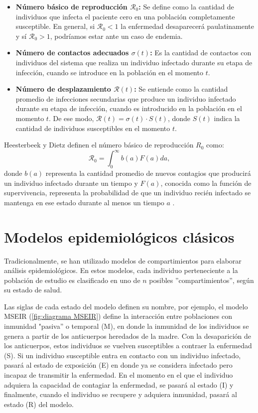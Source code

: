\begin{itemize}
    \item \textbf{Número básico de reproducción $\mathcal{R}_0$:} Se define como la cantidad de individuos que infecta el paciente cero en una población completamente susceptible. En general, si $\mathcal{R}_0<1$ la enfermedad desaparecerá paulatinamente y sí $\mathcal{R}_0>1$, podríamos estar ante un caso de endemia.
    \item \textbf{Número de contactos adecuados $\sigma(t)$:} Es la cantidad de contactos con individuos del sistema que realiza un individuo infectado durante su etapa de infección, cuando se introduce en la población en el momento $t$.
    \item \textbf{Número de desplazamiento $\mathcal{R}(t)$:} Se entiende como la cantidad promedio de infecciones secundarias que produce un individuo infectado durante su etapa de infección, cuando es introducido en la población en el momento $t$. De ese modo, $\mathcal{R}(t) = \sigma(t)\cdot S(t)$, donde $S(t)$ indica la cantidad de individuos susceptibles en el momento $t$.
\end{itemize}

Heesterbeek y Dietz definen el número básico de reproducción $R_0$ como:
\begin{equation}\label{eq:R0}
    \mathcal{R}_0 = \int_0^\infty b(a)F(a) da,
\end{equation}
donde $b(a)$ representa la cantidad promedio de nuevos contagios que producirá un individuo infectado durante un tiempo y $F(a)$, conocida como la función de supervivencia, representa la probabilidad de que un individuo recién infectado se mantenga en ese estado durante al menos un tiempo $a$ \cite{conceptOfR0, perspectivesOnR0}.

\section{Modelos epidemiológicos clásicos}\label{sec:Modelos epidemiológicos clásicos}

Tradicionalmente, se han utilizado modelos de compartimientos para elaborar análisis epidemiológicos. En estos modelos, cada individuo perteneciente a la población de estudio es clasificado en uno de $n$ posibles ''compartimientos'', según su estado de salud.

Las siglas de cada estado del modelo definen su nombre, por ejemplo, el modelo MSEIR (\ref{fig:diagrama MSEIR}) define la interacción entre poblaciones con inmunidad "pasiva'' o temporal (M), en donde la inmunidad de los individuos se genera a partir de los anticuerpos heredados de la madre. Con la desaparición de los anticuerpos, estos individuos se vuelven susceptibles a contraer la enfermedad (S). Si un individuo susceptible entra en contacto con un individuo infectado, pasará al estado de exposición (E) en donde ya se considera infectado pero incapaz de transmitir la enfermedad. En el momento en el que el individuo adquiera la capacidad de contagiar la enfermedad, se pasará al estado (I) y finalmente, cuando el individuo se recupere y adquiera inmunidad, pasará al estado (R) del modelo.\cite{modelCompartimental}


